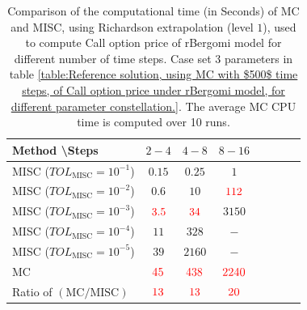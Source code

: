 \begin{table}[h!]
	\centering
	\begin{tabular}{l*{6}{c}r}
		Method \textbackslash  Steps            & $2-4$ & $4-8$ & $8-16$ &   \\
		\hline
		MISC ($TOL_{\text{MISC}}=10^{-1}$)   & $0.15$ & $0.25$ & $1$  \\
		MISC ($TOL_{\text{MISC}}=10^{-2}$)   & $0.6$ & $10$ & ${\color{red}112}$  \\
		MISC ($TOL_{\text{MISC}}=10^{-3}$)  & ${\color{red}3.5}$ & ${\color{red}34}$ & $3150$ \\
		MISC ($TOL_{\text{MISC}}=10^{-4}$) & $11$ & $328$ & $-$  \\
		MISC ($TOL_{\text{MISC}}=10^{-5}$)   & $39$ & $2160$ & $-$  \\
		\hline	
			MC  & ${\color{red}45}$  & ${\color{red}438}$  & ${\color{red}2240}$ \\
			
			\hline
				Ratio of $\left(\text{MC}/ \text{MISC} \right)$   & ${\color{red}13}$  & ${\color{red}13}$  & ${\color{red}20}$ \\

		\hline
	\end{tabular}
	\caption{Comparison of the computational time (in Seconds) of  MC and MISC, using Richardson extrapolation (level $1$), used to compute Call option price of rBergomi model for different number of time steps. Case set $3$ parameters in table \ref{table:Reference solution, using MC with $500$ time steps, of Call option price under rBergomi model, for different parameter constellation.}. The
average MC CPU time is computed over 10 runs.}
	\label{Comparsion of the computational time of  MC and MISC, using Richardson extrapolation (level $1$), used to compute Call option price of rBergomi model for different number of time steps. Case set $3$ parameters}
\end{table}




